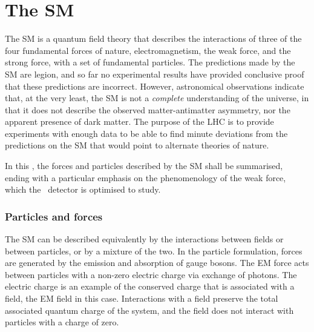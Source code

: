 \chapter{The \acl{SM}}
\label{chap:intro:sm}

The \acf{SM} is a quantum field theory that describes the interactions of three 
of the four fundamental forces of nature, electromagnetism, the weak force, and 
the strong force, with a set of fundamental particles.
The predictions made by the \ac{SM} are legion, and so far no experimental 
results have provided conclusive proof that these predictions are incorrect.
However, astronomical observations indicate that, at the very least, the 
\ac{SM} is not a \emph{complete} understanding of the universe, in that it does 
not describe the observed matter-antimatter asymmetry, nor the apparent 
presence of dark matter.
The purpose of the \ac{LHC} is to provide experiments with enough data to be 
able to find minute deviations from the predictions on the \ac{SM} that would 
point to alternate theories of nature.

In this , the forces and particles described by the 
\ac{SM} shall be summarised, ending with a particular emphasis on the 
phenomenology of the weak force, which the \lhcb\ detector is optimised to 
study.

\subsection{Particles and forces}

The \ac{SM} can be described equivalently by the interactions between fields or 
between particles, or by a mixture of the two.
In the particle formulation, forces are generated by the emission and 
absorption of gauge bosons.
The \ac{EM} force acts between particles with a non-zero electric charge via 
exchange of photons.
The electric charge is an example of the conserved charge that is associated 
with a field, the \ac{EM} field in this case.
Interactions with a field preserve the total associated quantum charge of the 
system, and the field does not interact with particles with a charge of zero.

